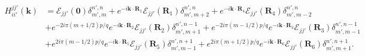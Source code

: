 \documentclass{report}
\begin{document}

\begin{equation}
	\begin{aligned}
		H_{ii'}^{jj'}(\mathbf{k})
		 & = \mathcal{E}_{jj'}(\mathbf{0}) \delta_{m',m}^{n',n} + e^{-i\mathbf{k} \cdot \mathbf{R}_{1}}\mathcal{E}_{jj'}(\mathbf{R}_{1}) \delta_{m',m+2}^{n',n} + e^{-i\mathbf{k} \cdot \mathbf{R}_{4}}\mathcal{E}_{jj'}(\mathbf{R}_{4})  \delta_{m',m-2}^{n',n}            \\
		 & + e^{-2i\pi(m + 1/2)p / q}e^{-i\mathbf{k} \cdot \mathbf{R}_{2}} \mathcal{E}_{jj'}(\mathbf{R}_{2}) \delta_{m',m+1}^{n',n-1} + e^{-2i\pi(m - 1/2)p / q} e^{-i\mathbf{k} \cdot \mathbf{R}_{3}} \mathcal{E}_{jj'}(\mathbf{R}_{3}) \delta_{m',m-1}^{n',n-1} \\
		 & + e^{2i\pi(m - 1/2)p / q} e^{-i\mathbf{k} \cdot \mathbf{R}_{5}} \mathcal{E}_{jj'}(\mathbf{R}_{5}) \delta_{m',m-1}^{n',n+1} + e^{2i\pi(m + 1/2)p / q} e^{-i\mathbf{k} \cdot \mathbf{R}_{6}} \mathcal{E}_{jj'}(\mathbf{R}_{6}) \delta_{m',m+1}^{n',n+1}.
	\end{aligned}
\end{equation}
\end{document}
